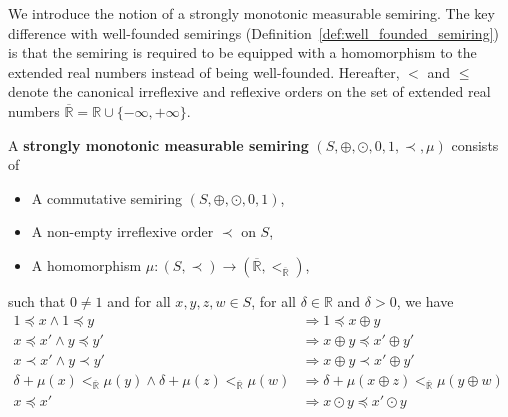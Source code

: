 We introduce the notion of a strongly monotonic measurable semiring.
The key difference with well-founded semirings (Definition~\ref{def:well_founded_semiring}) is that the semiring is required to be equipped with a homomorphism to the extended real numbers instead of being well-founded.
Hereafter, $<$ and $\leq$ denote the canonical irreflexive and reflexive orders on the set of extended real numbers $\overline{\mathbb{R}} = \mathbb{R} \cup \{-\infty, +\infty\}$.
\begin{definition} 
    \label{def:real_strongly_monotonic_semiring}
    A \textbf{strongly monotonic measurable semiring} $(S, \oplus, \odot, 0, 1, \prec, \mu)$ consists of
    \begin{itemize} 
        \item A commutative semiring $(S, \oplus, \odot, 0, 1)$,
        \item A non-empty irreflexive order $\prec$ on $S$,
        \item A homomorphism $\mu : (S, \prec) \to ( \overline{\mathbb{R}}, <_{\overline{\mathbb{R}}} )$,
    \end{itemize}
    such that $0 \neq 1$ and for all $x,y,z,w \in S$, for all $\delta \in \mathbb{R}$ and $\delta>0$, we have
        \begin{align*}
            1 \preceq x \land 1 \preceq y 
            &\Rightarrow
            1 \preceq x \oplus y
            &\tag{S0} \label{ax:s0} 
            \\ 
            x \preceq x' \land y \preceq y' 
            &\Rightarrow
            x \oplus y \preceq x' \oplus y'
            &\tag{S1} \label{ax:s1} 
            \\   
            x \prec x' \land y \prec y'  
            &\Rightarrow
            x \oplus y \prec x' \oplus y'
            &\tag{S2} \label{ax:s2} 
            \\
            \delta + \mu(x) <_{\overline{\mathbb{R}}} \mu(y) \land \delta + \mu(z) <_{\overline{\mathbb{R}}} \mu(w)
            &\Rightarrow
            \delta + \mu(x \oplus z) <_{\overline{\mathbb{R}}} \mu(y \oplus w)
            &\tag{S3} \label{ax:s2'}
            \\
            x \preceq x'
            &\Rightarrow 
            x \odot y \preceq x' \odot y 
            &\tag{S4} \label{ax:s3} 
            \\

\end{align*}
\end{definition}
